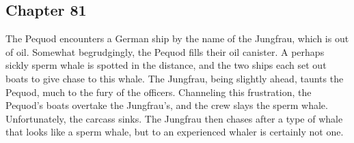 \subsection{Chapter 81}

The Pequod encounters a German ship by the name of the Jungfrau, which is out
of oil. Somewhat begrudgingly, the Pequod fills their oil canister. A perhaps
sickly sperm whale is spotted in the distance, and the two ships each set out
boats to give chase to this whale. The Jungfrau, being slightly ahead, taunts
the Pequod, much to the fury of the officers. Channeling this frustration, the
Pequod's boats overtake the Jungfrau's, and the crew slays the sperm whale.
Unfortunately, the carcass sinks. The Jungfrau then chases after a type of
whale that looks like a sperm whale, but to an experienced whaler is certainly
not one.
